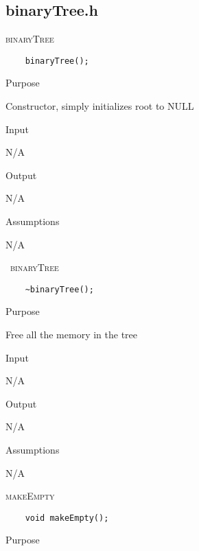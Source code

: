 \documentclass[pdftex, 12pt]{article}
\begin{document}
\subsection{binaryTree.h}
\begin{description}

	\item{\textsc{binaryTree}}
\begin{lstlisting}
	binaryTree();
\end{lstlisting}
		\begin{description}

			\item{Purpose}

				Constructor, simply initializes root to NULL

			\item{Input}

				N/A

			\item{Output}

				N/A

			\item{Assumptions}

				N/A

		\end{description}
	\item{\textsc{~binaryTree}}
\begin{lstlisting}
	~binaryTree();
\end{lstlisting}
		\begin{description}

			\item{Purpose}

				Free all the memory in the tree

			\item{Input}

				N/A

			\item{Output}

				N/A

			\item{Assumptions}

				N/A

		\end{description}
	\item{\textsc{makeEmpty}}
\begin{lstlisting}
	void makeEmpty();
\end{lstlisting}
		\begin{description}

			\item{Purpose}
				

\end{description}
\end{description}
\end{document}
